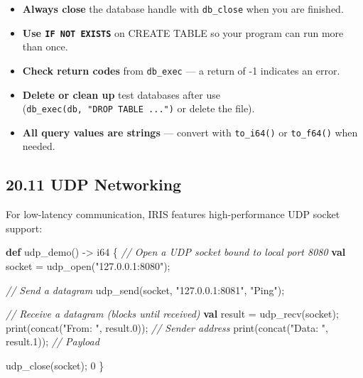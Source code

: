 \documentclass[
  english,
]{book}
\newenvironment{Shaded}{\begin{snugshade}}{\end{snugshade}}
\newcommand{\CommentTok}[1]{\textcolor[rgb]{0.42,0.60,0.33}{\textit{#1}}}
\newcommand{\DataTypeTok}[1]{\textcolor[rgb]{0.31,0.79,0.69}{#1}}
\newcommand{\DecValTok}[1]{\textcolor[rgb]{0.71,0.81,0.66}{#1}}
\newcommand{\FunctionTok}[1]{\textcolor[rgb]{0.86,0.86,0.67}{#1}}
\newcommand{\KeywordTok}[1]{\textcolor[rgb]{0.34,0.61,0.84}{\textbf{#1}}}
\newcommand{\NormalTok}[1]{\textcolor[rgb]{0.83,0.83,0.83}{#1}}
\newcommand{\OperatorTok}[1]{\textcolor[rgb]{0.83,0.83,0.83}{#1}}
\newcommand{\StringTok}[1]{\textcolor[rgb]{0.81,0.57,0.47}{#1}}
\providecommand{\tightlist}{%
  \setlength{\itemsep}{0pt}\setlength{\parskip}{0pt}}
\begin{document}
\begin{itemize}
\tightlist
\item
  \textbf{Always close} the database handle with \texttt{db\_close} when
  you are finished.
\item
  \textbf{Use \texttt{IF\ NOT\ EXISTS}} on CREATE TABLE so your program
  can run more than once.
\item
  \textbf{Check return codes} from \texttt{db\_exec} --- a return of -1
  indicates an error.
\item
  \textbf{Delete or clean up} test databases after use
  (\texttt{db\_exec(db,\ "DROP\ TABLE\ ...")} or delete the file).
\item
  \textbf{All query values are strings} --- convert with
  \texttt{to\_i64()} or \texttt{to\_f64()} when needed.
\end{itemize}

\subsection{20.11 UDP Networking}\label{udp-networking}

For low-latency communication, IRIS features high-performance UDP socket
support:

\begin{Shaded}
\begin{Highlighting}[]
\KeywordTok{def}\NormalTok{ udp\_demo() }\OperatorTok{{-}\textgreater{}} \DataTypeTok{i64}\NormalTok{ \{}
    \CommentTok{// Open a UDP socket bound to local port 8080}
    \KeywordTok{val}\NormalTok{ socket }\OperatorTok{=} \FunctionTok{udp\_open}\NormalTok{(}\StringTok{"127.0.0.1:8080"}\NormalTok{);}
    
    \CommentTok{// Send a datagram}
    \FunctionTok{udp\_send}\NormalTok{(socket, }\StringTok{"127.0.0.1:8081"}\NormalTok{, }\StringTok{"Ping"}\NormalTok{);}
    
    \CommentTok{// Receive a datagram (blocks until received)}
    \KeywordTok{val} \DataTypeTok{result} \OperatorTok{=} \FunctionTok{udp\_recv}\NormalTok{(socket);}
    \FunctionTok{print}\NormalTok{(}\FunctionTok{concat}\NormalTok{(}\StringTok{"From: "}\NormalTok{, }\DataTypeTok{result}\OperatorTok{.}\DecValTok{0}\NormalTok{)); }\CommentTok{// Sender address}
    \FunctionTok{print}\NormalTok{(}\FunctionTok{concat}\NormalTok{(}\StringTok{"Data: "}\NormalTok{, }\DataTypeTok{result}\OperatorTok{.}\DecValTok{1}\NormalTok{)); }\CommentTok{// Payload}
    
    \FunctionTok{udp\_close}\NormalTok{(socket);}
    \DecValTok{0}
\NormalTok{\}}
\end{Highlighting}
\end{Shaded}
\end{document}

